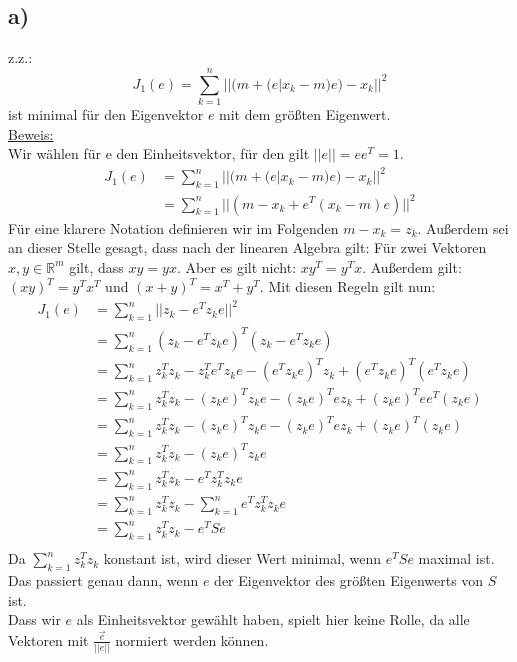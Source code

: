 \documentclass[a4paper]{scrartcl}
\begin{document}
\subsection*{a)}
z.z.: $$J_1(e) = \sum_{k=1}^{n} ||(m+(e|x_k - m)e) - x_k||^2$$
ist minimal für den Eigenvektor $e$ mit dem größten Eigenwert.\\
\underline{Beweis:}\\
Wir wählen für e den Einheitsvektor, für den gilt $||e|| = ee^T = 1$.
\begin{align*}
	J_1(e) &= \sum_{k=1}^{n} ||(m+(e|x_k - m)e) - x_k||^2\\
	&= \sum_{k=1}^{n} ||(m - x_k + e^T(x_k - m)e)||^2
\end{align*}
Für eine klarere Notation definieren wir im Folgenden $m-x_k = z_k$. Außerdem sei an dieser Stelle gesagt, dass nach der linearen Algebra gilt: Für zwei Vektoren $x,y \in \mathbb{R}^m$ gilt, dass $xy = yx$. Aber es gilt nicht: $xy^T = y^Tx$. Außerdem gilt: $(xy)^T = y^Tx^T$ und $(x + y)^T = x^T + y^T$. Mit diesen Regeln gilt nun:
\begin{align*}
	J_1(e) &= \sum_{k=1}^{n} ||z_k-e^Tz_ke||^2\\
	&=  \sum_{k=1}^{n} (z_k-e^Tz_ke)^T(z_k-e^Tz_ke)\\
	&= \sum_{k=1}^{n} z_k^Tz_k - z_k^Te^Tz_ke - (e^Tz_ke)^Tz_k + (e^Tz_ke)^T(e^Tz_ke)\\
	&= \sum_{k=1}^{n} z_k^Tz_k - (z_ke)^Tz_ke - (z_ke)^Tez_k + (z_ke)^Tee^T(z_ke)\\
	&= \sum_{k=1}^{n} z_k^Tz_k - (z_ke)^Tz_ke - (z_ke)^Tez_k + (z_ke)^T(z_ke)\\
	&= \sum_{k=1}^{n} z_k^Tz_k - (z_ke)^Tz_ke\\
	&= \sum_{k=1}^{n} z_k^Tz_k - e^Tz_k^Tz_ke\\
	&= \sum_{k=1}^{n} z_k^Tz_k - \sum_{k=1}^{n}e^Tz_k^Tz_ke\\
	&= \sum_{k=1}^{n} z_k^Tz_k - e^TSe\\
\end{align*}
Da $\sum_{k=1}^{n} z_k^Tz_k$ konstant ist, wird dieser Wert minimal, wenn $ e^TSe$ maximal ist. Das passiert genau dann, wenn $e$ der Eigenvektor des größten Eigenwerts von $S$ ist. \\
Dass wir $e$ als Einheitsvektor gewählt haben, spielt hier keine Rolle, da alle Vektoren mit $\frac{\vec{e}}{||e||}$ normiert werden können.
\end{document}

